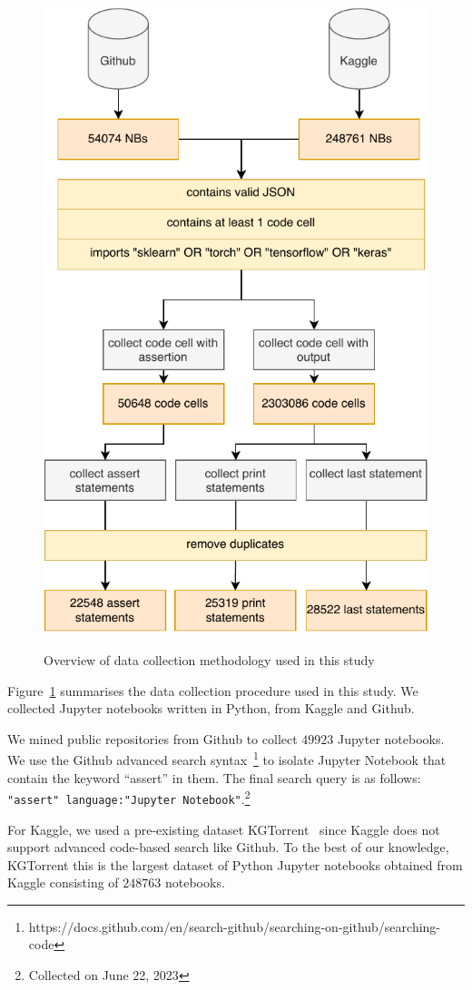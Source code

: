 \begin{figure}
  \centering
  \includegraphics[width=0.75\linewidth]{data-collection.pdf}
  \label{fig:data-collection}
  \caption{Overview of data collection methodology used in this study}
\end{figure}

Figure~\ref{fig:data-collection} summarises the data collection procedure used in this study. We collected Jupyter notebooks written in Python, from Kaggle and Github. 

We mined public repositories from Github to collect $49923$ Jupyter notebooks. We use the Github advanced search syntax~\footnote{https://docs.github.com/en/search-github/searching-on-github/searching-code} to isolate Jupyter Notebook that contain the keyword ``assert'' in them. The final search query is as follows: \texttt{"assert" language:"Jupyter Notebook"}.\footnote{Collected on June 22, 2023}

For Kaggle, we used a pre-existing dataset KGTorrent~\cite{quaranta2021kgtorrent} since Kaggle does not support advanced code-based search like Github. To the best of our knowledge, KGTorrent this is the largest dataset of Python Jupyter notebooks obtained from Kaggle consisting of $248763$ notebooks.

